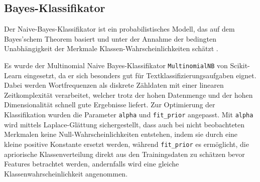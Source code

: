 \subsection{Bayes-Klassifikator}
\label{sec:bayes-klassifikator}

Der Naive-Bayes-Klassifikator ist ein probabilistisches Modell, das auf dem Bayes'schem Theorem basiert und unter der Annahme der bedingten Unabhängigkeit der Merkmale Klassen-Wahrscheinlichkeiten schätzt \cite{Bishop2019}.

Es wurde der Multinomial Naive Bayes-Klassifikator \texttt{MultinomialNB} von Scikit-Learn \cite{Pedregosa2011} eingesetzt, da er sich besonders gut für Textklassifizierungsaufgaben eignet. Dabei werden Wortfrequenzen als diskrete Zähldaten mit einer linearen Zeitkomplexität \cite{Manning2009} verarbeitet, welcher trotz der hohen Datenmenge und der hohen Dimensionalität schnell gute Ergebnisse liefert. Zur Optimierung der Klassifikation wurden die Parameter \texttt{alpha} und \texttt{fit\_prior} angepasst. Mit \texttt{alpha} wird mittels Laplace-Glättung sichergestellt, dass auch bei nicht beobachteten Merkmalen keine Null-Wahrscheinlichkeiten entstehen, indem sie durch eine kleine positive Konstante ersetzt werden, während \texttt{fit\_prior} es ermöglicht, die apriorische Klassenverteilung direkt aus den Trainingsdaten zu schätzen bevor Features betrachtet werden, andernfalls wird eine gleiche Klassenwahrscheinlichkeit angenommen.
